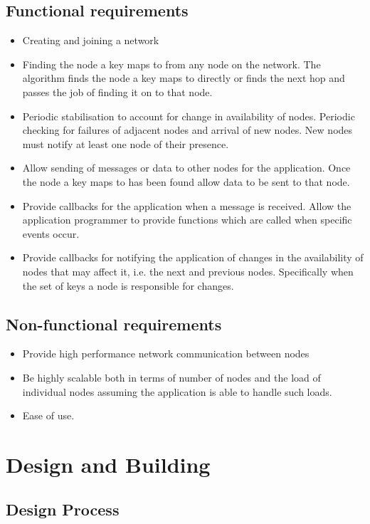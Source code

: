 \documentclass{article}
\begin{document}
\subsection{Functional requirements}
\begin{itemize}
\item
Creating and joining a network
\item
Finding the node a key maps to from any node on the network.
The algorithm finds the node a key maps to directly or finds the next hop and passes the job of finding it on to that node.
\item
Periodic stabilisation to account for change in availability of nodes.
Periodic checking for failures of adjacent nodes and arrival of new nodes. New nodes must notify at least one node of their presence.
\item
Allow sending of messages or data to other nodes for the application.
Once the node a key maps to has been found allow data to be sent to that node.
\item
Provide callbacks for the application when a message is received.
Allow the application programmer to provide functions which are called when specific events occur.
\item
Provide callbacks for notifying the application of changes in the availability of nodes that may affect it, i.e. the next and previous nodes. Specifically when the set of keys a node is responsible for changes.
\end{itemize}


\subsection{Non-functional requirements}
\begin{itemize}
\item
Provide high performance network communication between nodes
\item
Be highly scalable both in terms of number of nodes and the load of individual nodes assuming the application is able to handle such loads.
\item
Ease of use.
\end{itemize}

\section{Design and Building}

\subsection{Design Process}
\end{document}
